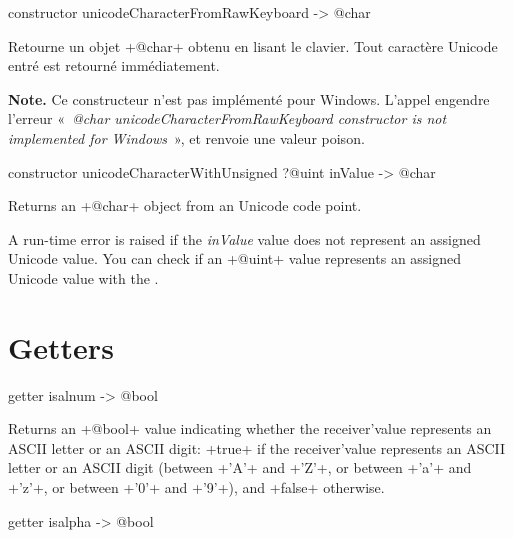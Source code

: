 
\begin{galgas}
constructor unicodeCharacterFromRawKeyboard -> @char
\end{galgas}


Retourne un objet \ggs+@char+ obtenu en lisant le clavier. Tout caractère Unicode entré est retourné immédiatement.

{\bf Note.} Ce constructeur n'est pas implémenté pour Windows. L'appel engendre l'erreur «~\emph{@char unicodeCharacterFromRawKeyboard constructor is not implemented for Windows}~», et renvoie une valeur poison.







\begin{galgas}
constructor unicodeCharacterWithUnsigned ?@uint inValue -> @char
\end{galgas}


Returns an \ggs+@char+ object from an Unicode code point.

A run-time error is raised if the \emph{inValue} value does not represent an assigned Unicode value. You can check if an \ggs+@uint+ value represents an assigned Unicode value with the .


\section{Getters}



\begin{galgas}
getter isalnum -> @bool
\end{galgas}

Returns an \ggs+@bool+ value indicating whether the receiver'value represents an ASCII letter or an ASCII digit: \ggs+true+ if the receiver'value represents an ASCII letter or an ASCII digit (between \ggs+'A'+ and \ggs+'Z'+, or between \ggs+'a'+ and \ggs+'z'+, or between \ggs+'0'+ and \ggs+'9'+), and \ggs+false+ otherwise.





\begin{galgas}
getter isalpha -> @bool
\end{galgas}

